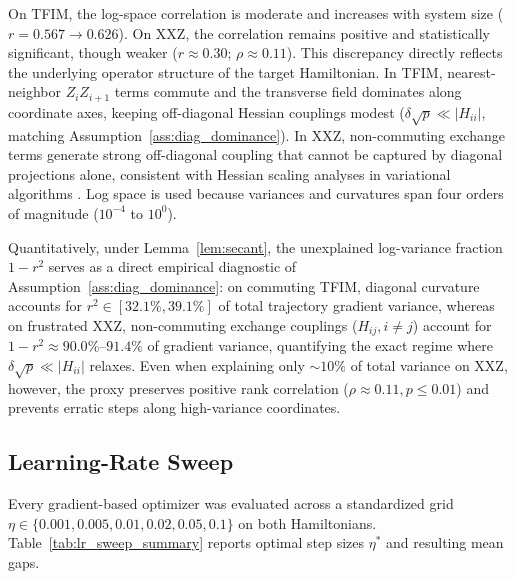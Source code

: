 \documentclass[sn-mathphys,Numbered]{sn-jnl}
\theoremstyle{thmstyleone}
\theoremstyle{thmstyletwo}
\theoremstyle{thmstylethree}
\begin{document}
On TFIM, the log-space correlation is moderate and increases with system size ($r = 0.567 \to 0.626$). On XXZ, the correlation remains positive and statistically significant, though weaker ($r \approx 0.30$; $\rho \approx 0.11$). This discrepancy directly reflects the underlying operator structure of the target Hamiltonian. In TFIM, nearest-neighbor $Z_i Z_{i+1}$ terms commute and the transverse field dominates along coordinate axes, keeping off-diagonal Hessian couplings modest ($\delta \sqrt{p} \ll |H_{ii}|$, matching Assumption~\ref{ass:diag_dominance}). In XXZ, non-commuting exchange terms generate strong off-diagonal coupling that cannot be captured by diagonal projections alone, consistent with Hessian scaling analyses in variational algorithms \cite{hessian_resolvability_2026}. Log space is used because variances and curvatures span four orders of magnitude ($10^{-4}$ to $10^0$). 

Quantitatively, under Lemma~\ref{lem:secant}, the unexplained log-variance fraction $1 - r^2$ serves as a direct empirical diagnostic of Assumption~\ref{ass:diag_dominance}: on commuting TFIM, diagonal curvature accounts for $r^2 \in [32.1\%, 39.1\%]$ of total trajectory gradient variance, whereas on frustrated XXZ, non-commuting exchange couplings ($H_{ij}, i \ne j$) account for $1 - r^2 \approx 90.0\%\text{--}91.4\%$ of gradient variance, quantifying the exact regime where $\delta\sqrt{p} \ll |H_{ii}|$ relaxes. Even when explaining only $\sim 10\%$ of total variance on XXZ, however, the proxy preserves positive rank correlation ($\rho \approx 0.11, p \le 0.01$) and prevents erratic steps along high-variance coordinates.

\FloatBarrier

\subsection{Learning-Rate Sweep}
\label{sec:lr_sweep_results}
Every gradient-based optimizer was evaluated across a standardized grid $\eta \in \{0.001, 0.005, 0.01, 0.02, 0.05, 0.1\}$ on both Hamiltonians. Table~\ref{tab:lr_sweep_summary} reports optimal step sizes $\eta^*$ and resulting mean gaps.
\end{document}
